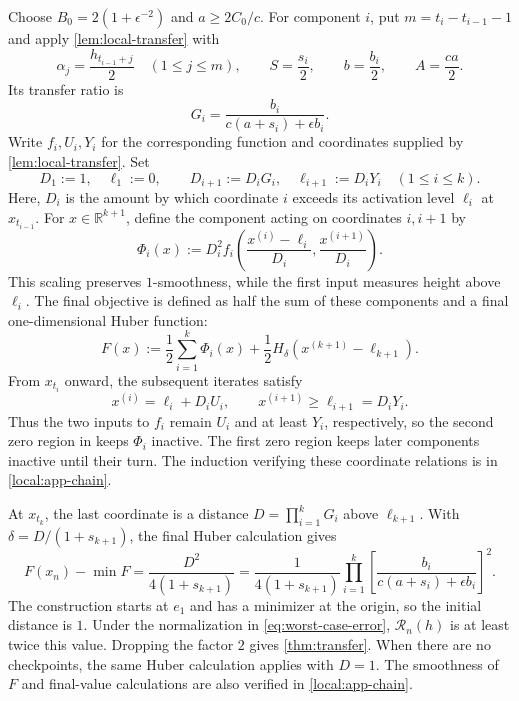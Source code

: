 \documentclass[11pt,letterpaper]{article}
\theoremstyle{definition}
\newcommand{\R}{\mathbb R}
\begin{document}
Choose $B_0=2(1+\epsilon^{-2})$ and $a\ge 2C_0/c$.
For component $i$, put $m=t_i-t_{i-1}-1$ and apply \cref{lem:local-transfer} with
\[
  \alpha_j=\frac{h_{t_{i-1}+j}}2\quad(1\le j\le m),\qquad
  S=\frac{s_i}2,\qquad b=\frac{b_i}2,\qquad A=\frac{ca}2.
\]
Its transfer ratio is
\[
  G_i=\frac{b_i}{c(a+s_i)+\epsilon b_i}.
\]
Write $f_i,U_i,Y_i$ for the corresponding function and coordinates supplied by \cref{lem:local-transfer}. Set
\begin{equation}
  D_1:=1,\quad\ell_1:=0,\qquad
  D_{i+1}:=D_iG_i,\quad\ell_{i+1}:=D_iY_i\quad(1\le i\le k).
  \label{local:chain-parameters}
\end{equation}
Here, $D_i$ is the amount by which coordinate $i$ exceeds its activation level $\ell_i$ at $x_{t_{i-1}}$.
For $x\in\R^{k+1}$, define the component acting on coordinates $i,i+1$ by
\begin{equation}
  \Phi_i(x):=D_i^2 f_i\left(
    \frac{x^{(i)}-\ell_i}{D_i},\frac{x^{(i+1)}}{D_i}\right).
  \label{local:chain-component}
\end{equation}
This scaling preserves $1$-smoothness, while the first input measures height above $\ell_i$.
The final objective is defined as half the sum of these components and a final one-dimensional Huber function:
\begin{equation}
  F(x):=\frac12\sum_{i=1}^k\Phi_i(x)
       +\frac12H_\delta(x^{(k+1)}-\ell_{k+1}).
  \label{local:global-objective}
\end{equation}
From $x_{t_i}$ onward, the subsequent iterates satisfy
\[
  x^{(i)}=\ell_i+D_iU_i,\qquad
  x^{(i+1)}\ge\ell_{i+1}=D_iY_i.
\]
Thus the two inputs to $f_i$ remain $U_i$ and at least $Y_i$, respectively, so the second zero region in  keeps $\Phi_i$ inactive.
The first zero region keeps later components inactive until their turn.
The induction verifying these coordinate relations is in \cref{local:app-chain}.

At $x_{t_k}$, the last coordinate is a distance $D=\prod_{i=1}^kG_i$ above $\ell_{k+1}$.
With $\delta=D/(1+s_{k+1})$, the final Huber calculation gives
\[
  F(x_n)-\min F
  =\frac{D^2}{4(1+s_{k+1})}
  =\frac{1}{4(1+s_{k+1})}
    \prod_{i=1}^k
    \left[\frac{b_i}{c(a+s_i)+\epsilon b_i}\right]^2.
\]
The construction starts at $e_1$ and has a minimizer at the origin, so the initial distance is $1$.
Under the normalization in \eqref{eq:worst-case-error}, $\mathcal R_n(h)$ is at least twice this value.
Dropping the factor $2$ gives \cref{thm:transfer}.
When there are no checkpoints, the same Huber calculation applies with $D=1$.
The smoothness of $F$ and final-value calculations are also verified in \cref{local:app-chain}.
\end{document}
